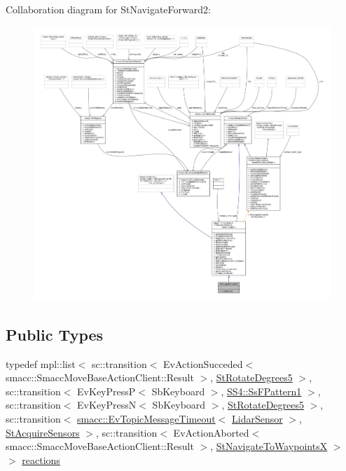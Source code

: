 Collaboration diagram for St\+Navigate\+Forward2\+:
\nopagebreak
\begin{figure}[H]
\begin{center}
\leavevmode
\includegraphics[width=350pt]{structStNavigateForward2__coll__graph}
\end{center}
\end{figure}
\subsection*{Public Types}
\begin{DoxyCompactItemize}
\item 
typedef mpl\+::list$<$ sc\+::transition$<$ Ev\+Action\+Succeded$<$ smacc\+::\+Smacc\+Move\+Base\+Action\+Client\+::\+Result $>$, \hyperlink{structStRotateDegrees5}{St\+Rotate\+Degrees5} $>$, sc\+::transition$<$ Ev\+Key\+PressP$<$ Sb\+Keyboard $>$, \hyperlink{structSS4_1_1SsFPattern1}{S\+S4\+::\+Ss\+F\+Pattern1} $>$, sc\+::transition$<$ Ev\+Key\+PressN$<$ Sb\+Keyboard $>$, \hyperlink{structStRotateDegrees5}{St\+Rotate\+Degrees5} $>$, sc\+::transition$<$ \hyperlink{structsmacc_1_1EvTopicMessageTimeout}{smacc\+::\+Ev\+Topic\+Message\+Timeout}$<$ \hyperlink{sensor__state_8h_a9db9e1944f88de79507758d08e4a2ee3}{Lidar\+Sensor} $>$, \hyperlink{structStAcquireSensors}{St\+Acquire\+Sensors} $>$, sc\+::transition$<$ Ev\+Action\+Aborted$<$ smacc\+::\+Smacc\+Move\+Base\+Action\+Client\+::\+Result $>$, \hyperlink{structStNavigateToWaypointsX}{St\+Navigate\+To\+WaypointsX} $>$ $>$ \hyperlink{structStNavigateForward2_a804708f3d98ef46f3c5d5938c8cbcf14}{reactions}
\end{DoxyCompactItemize}
